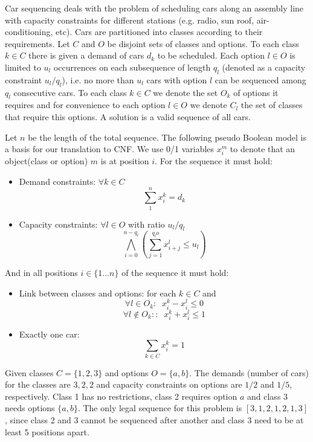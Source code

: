 \documentclass[]{llncs}
\begin{document}
Car sequencing deals with the problem of scheduling cars along an assembly line with capacity constraints for different
stations (e.g. radio, sun roof, air-conditioning, etc). Cars are partitioned into classes according to their
requirements. Let $C$ and $O$ be disjoint sets of classes and options. To each class $k\in C$ there is given a demand of
cars $d_k$ to be scheduled. Each option $l\in O$ is limited to $u_l$ occurrences on each subsequence of length $q_l$
(denoted as a capacity constraint $u_l/q_l$), i.e.  no more than $u_l$ cars with option $l$ can be sequenced among $q_l$
consecutive cars. To each class $k\in C$ we denote the set $O_k$ of options it requires and for convenience to each
option $l\in O$ we denote $C_l$ the set of classes that require this options. A solution is a valid sequence of all
cars. 

Let $n$ be the length of the total sequence. The following pseudo Boolean model is a basis for our translation to CNF.
We use 0/1 variables $x^m_i$ to denote that an object(class or option) $m$ is at position $i$. For the sequence it must
hold: 

\begin{itemize}
    \item Demand constraints: $\forall k \in C$ $$\sum^n_1 x^k_i = d_k$$                       
    \item Capacity constraints: $\forall l \in O$ with ratio $u_l/q_l$ $$\bigwedge_{i=0}^{n-q_l}(\sum_{j=1}^{q_lo} x^l_{i+j} \leq u_l )$$
\end{itemize}
        And in all positions $i \in \{1\ldots n\}$ of the sequence it must hold:                                                    
\begin{itemize}
    \item Link between classes and options: for each $k\in C$ and 
 $$\forall l \in O_k :\;\; x^k_i - x^l_i \leq 0$$  
 $$\forall l \not \in O_k : :\;\; x^k_i + x^l_i \leq 1$$  
    \item Exactly one car:  $$\sum_{k\in C} x^k_i = 1$$  
\end{itemize}

\begin{example} 
    Given classes $C = \{1,2,3\}$ and options $O = \{a,b\}$. The demands (number of cars) for the classes are $3,2,2$
    and capacity constraints on options are $1/2$ and $1/5$, respectively. Class 1 has no restrictions, class 2 requires
    option $a$ and class 3 needs options $\{a, b\}$. The only legal sequence for this problem is $[3,1,2,1,2,1,3]$,
    since class 2 and 3 cannot be sequenced after another and class 3 need to be at least 5 positions apart.
\end{example}                                     
\end{document}
